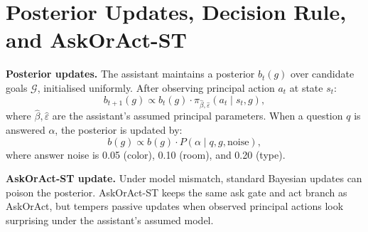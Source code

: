 \documentclass[10pt,twocolumn]{article}
\begin{document}
\begin{table}[h]
\centering
\caption{Comparison to closest prior work. \checkmark~=~present; $\circ$~=~partial; --~=~absent.}
\label{tab:prior_work}
\end{table}

\section{Posterior Updates, Decision Rule, and AskOrAct-ST}
\label{app:derivation}

\textbf{Posterior updates.}
The assistant maintains a posterior $b_t(g)$ over candidate goals $\mathcal{G}$, initialised uniformly.
After observing principal action $a_t$ at state $s_t$:
\[
  b_{t+1}(g) \propto b_t(g) \cdot \pi_{\hat\beta,\hat\varepsilon}(a_t \mid s_t, g),
\]
where $\hat\beta, \hat\varepsilon$ are the assistant's assumed principal parameters.
When a question $q$ is answered $\alpha$, the posterior is updated by:
\[
  b(g) \propto b(g) \cdot P(\alpha \mid q, g, \text{noise}),
\]
where answer noise is 0.05 (color), 0.10 (room), and 0.20 (type).

\textbf{AskOrAct-ST update.}
Under model mismatch, standard Bayesian updates can poison the posterior. AskOrAct-ST keeps the same ask gate and act branch as AskOrAct, but tempers passive updates when observed principal actions look surprising under the assistant's assumed model.
\end{document}
